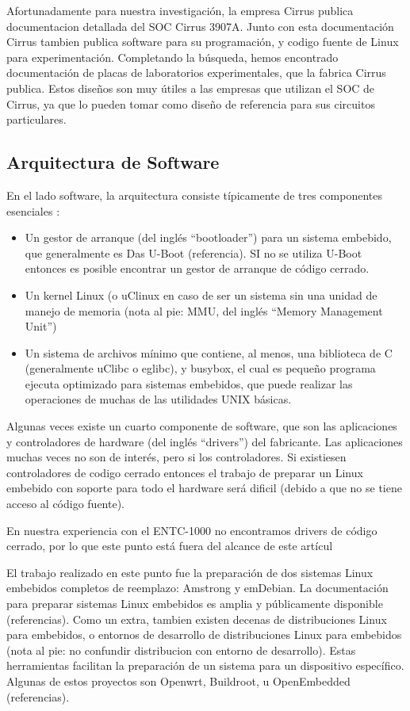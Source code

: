 \documentclass[conference]{IEEEtran}
\begin{document}
Afortunadamente para nuestra investigación,
la empresa Cirrus publica documentacion detallada del SOC Cirrus 3907A.
Junto con esta documentación Cirrus tambien publica software
para su programación, y codigo fuente de
Linux para experimentación. Completando la búsqueda, hemos encontrado
documentación de placas de laboratorios experimentales, que la fabrica Cirrus publica.
Estos diseños son muy útiles a las empresas que utilizan el SOC de Cirrus,
ya que lo pueden tomar como diseño de referencia para sus circuitos particulares.


\subsection{Arquitectura de Software}


En el lado software, la arquitectura consiste típicamente de tres componentes esenciales :

\begin{itemize}
\item Un gestor de arranque (del inglés ``bootloader'') para un sistema embebido,
que generalmente es Das U-Boot (referencia). SI no se utiliza U-Boot entonces
es posible encontrar un gestor de arranque de código cerrado.
\item Un kernel Linux (o uClinux en caso de ser un sistema sin una
unidad de manejo de memoria (nota al pie: MMU, del inglés ``Memory Management Unit'')
\item Un sistema de archivos mínimo que contiene, al menos, una biblioteca de C
(generalmente uClibc o eglibc), y busybox, el cual es pequeño programa ejecuta
optimizado para sistemas embebidos, que puede realizar las operaciones
de muchas de las utilidades UNIX básicas.
\end{itemize}

Algunas veces existe un cuarto componente de software, que son las aplicaciones
y controladores de hardware (del inglés ``drivers'') del fabricante.
Las aplicaciones muchas veces no son de interés, pero si los controladores.
Si existiesen controladores de codigo cerrado
entonces el trabajo de preparar un Linux embebido con soporte
para todo el hardware será dificil (debido a que no se tiene acceso
al código fuente).

En nuestra experiencia con el ENTC-1000 no encontramos drivers
de código cerrado, por lo que este punto está fuera del alcance de este artícul


El trabajo realizado en este punto fue la preparación
de dos sistemas Linux embebidos completos de reemplazo: Amstrong y emDebian.
La documentación para preparar sistemas Linux embebidos es amplia y públicamente
disponible (referencias). Como un extra, tambien existen decenas de
distribuciones Linux para embebidos,
o entornos de desarrollo de distribuciones Linux para embebidos (nota al pie:
no confundir distribucion con entorno de desarrollo). Estas herramientas
facilitan la preparación de un sistema para un dispositivo específico.
Algunas de estos proyectos son Openwrt, Buildroot, u OpenEmbedded (referencias).
\end{document}

